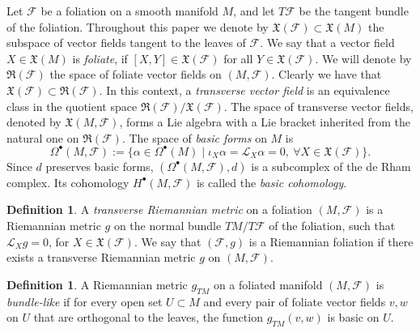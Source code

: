 \documentclass[reqno, 11pt]{amsart}
\theoremstyle{definition}
\newtheorem{defn}[thm]{Definition}
\theoremstyle{property}
\theoremstyle{remark}
\numberwithin{equation}{section}
\begin{document}
 Let $\mathcal{F}$ be a foliation on a smooth manifold $M$, and let $T\mathcal{F}$ be the tangent bundle of the foliation.
Throughout this paper we denote by
$\mathfrak{X}(\mathcal{F})\subset\mathfrak{X}(M)$ the subspace of vector fields tangent to the leaves of $\mathcal{F}$.
We say that a vector field $X\in\mathfrak{X}(M)$ is \emph{foliate}, if $[X,Y]\in\mathfrak{X}(\mathcal{F})$ for all $Y\in \mathfrak{X}(\mathcal{F})$.
We will denote by
$\mathfrak{R}(\mathcal{F})$ the space of foliate vector fields on $(M,\mathcal{F})$.
Clearly we have that
$\mathfrak{X}(\mathcal{F}) \subset \mathfrak{R}(\mathcal{F})$.
In this context,  a \emph{transverse vector field} is an equivalence class in the quotient space $\mathfrak{R}(\mathcal{F})/\mathfrak{X}(\mathcal{F})$. The space of transverse vector fields, denoted by $\mathfrak{X}(M, \mathcal{F})$, forms a Lie algebra with a Lie bracket inherited from the natural one on $\mathfrak{R}(\mathcal{F})$.
The space of \emph{basic forms} on $M$ is
\[
\Omega^\bullet(M,\mathcal F)
:=
\{\alpha\in \Omega^\bullet(M)\mid
\iota_X\alpha=\mathcal L_X\alpha=0,\ \forall X\in \mathfrak X(\mathcal F)\}.
\]
Since $d$ preserves basic forms, $(\Omega^\bullet(M,\mathcal F),d)$ is a subcomplex
of the de Rham complex. Its cohomology $H^\bullet(M,\mathcal F)$ is called the
\emph{basic cohomology}.



\begin{defn}
A \emph{transverse Riemannian metric} on a foliation $(M,\mathcal{F})$ is a Riemannian metric $g$ on the normal bundle $TM/T\mathcal{F}$ of the foliation, such that $\mathcal{L}_Xg=0$,
for $X\in\mathfrak{X}(\mathcal{F})$.
We say that $(\mathcal{F}, g)$ is a Riemannian foliation if there exists a transverse Riemannian metric $g$ on $(M,\mathcal{F})$.
\end{defn}

\begin{defn}
A Riemannian metric $g_{TM}$ on a foliated manifold $(M,\mathcal F)$ is
\emph{bundle-like} if for every open set $U\subset M$ and every pair of
foliate vector fields $v,w$ on $U$ that are orthogonal to the leaves,
the function $g_{TM}(v,w)$ is basic on $U$.
\end{defn}
\end{document}
